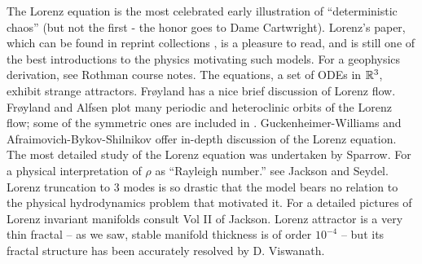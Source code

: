 

The Lorenz equation  is
the most celebrated early
illustration of ``deterministic chaos''
(but not the first -
the honor goes to Dame Cartwright).
Lorenz's paper, which can be found in reprint
collections , is a pleasure to read, and
is still one of the best introductions to the physics
motivating such models.
For a geophysics derivation, see Rothman course notes.
The equations, a set of ODEs in $\mathbb{R}^3$, exhibit strange
attractors.
Fr{\o}yland has a nice brief discussion
of Lorenz flow.
Fr{\o}yland and Alfsen plot
many periodic and heteroclinic orbits of the Lorenz flow;
some of the symmetric ones are included in .
Guckenheimer-Williams and
Afraimovich-Bykov-Shilnikov offer
in-depth discussion of the Lorenz equation.
The most detailed study of the Lorenz equation
was undertaken by Sparrow.
For a physical interpretation of $\rho$ as ``Rayleigh number.''
see Jackson and Seydel.
Lorenz truncation to 3 modes is
so drastic that the model bears no relation to  the physical
hydrodynamics problem that motivated it.
For a detailed pictures of Lorenz invariant manifolds consult
 Vol II of Jackson.
Lorenz attractor is a very thin fractal -- as we saw,
stable manifold thickness is of order $10^{-4}$ -- but its
fractal structure has been accurately resolved by
D. Viswanath.

